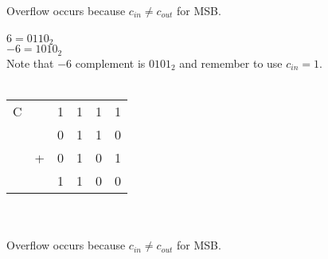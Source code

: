 \\
Overflow occurs because $c_{in} \neq c_{out}$ for MSB.\\
\\
$6 = 0110_2$\\
$-6 = 1010_2$\\
Note that $-6$ complement is $0101_2$ and remember to use $c_{in}=1$.\\
\\
\begin{tabular}{cccccc}
  C &   & 1 & 1 & 1 & 1 \\
    &   & 0 & 1 & 1 & 0 \\
    & + & 0 & 1 & 0 & 1 \\
  \hline
    &   & 1 & 1 & 0 & 0 \\
\end{tabular} \\
\\
Overflow occurs because $c_{in} \neq c_{out}$ for MSB.\\

